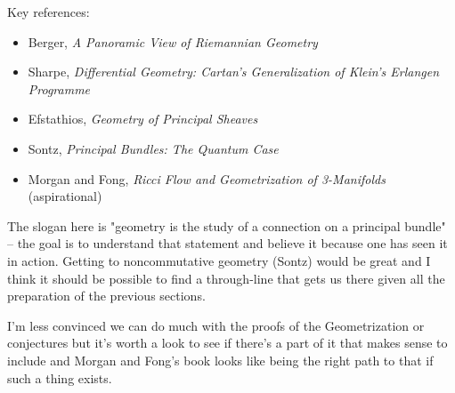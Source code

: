 \documentclass[article]{article}
\begin{document}
Key references:
\begin{itemize}
	\item{Berger, \textit{A Panoramic View of Riemannian Geometry}}
	\item{Sharpe, \textit{Differential Geometry: Cartan’s Generalization of Klein’s Erlangen Programme}}
	\item{Efstathios, \textit{Geometry of Principal Sheaves}}
	\item{Sontz, \textit{Principal Bundles: The Quantum Case}}
	\item{Morgan and Fong, \textit{Ricci Flow and Geometrization of 3-Manifolds} (aspirational)}
\end{itemize}

The slogan here is "geometry is the study of a connection on a principal bundle" -- the goal is to understand that statement and believe it because one has seen it in action. Getting to noncommutative geometry (Sontz) would be great and I think it should be possible to find a through-line that gets us there given all the preparation of the previous sections. 

I'm less convinced we can do much with the proofs of the Geometrization or \Poincare conjectures but it's worth a look to see if there's a part of it that makes sense to include and Morgan and Fong's book looks like being the right path to that if such a thing exists.
\end{document}
